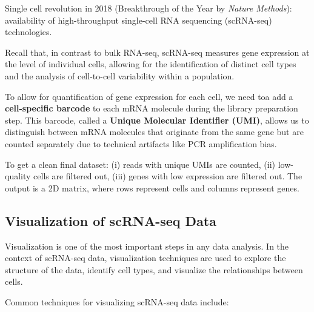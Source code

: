 \documentclass[a4paper]{article}
\begin{document}
Single cell revolution in 2018 (Breakthrough of the Year by \textit{Nature Methods}): availability
of high-throughput single-cell RNA sequencing (scRNA-seq) technologies.

Recall that, in contrast to bulk RNA-seq, scRNA-seq measures gene expression at the level of
individual cells, allowing for the identification of distinct cell types and the analysis of
cell-to-cell variability within a population.

To allow for quantification of gene expression for each cell, we need 
toa add a \textbf{cell-specific barcode} to each mRNA molecule during the library preparation
step. This barcode, called a \textbf{Unique Molecular Identifier (UMI)}, allows us to
distinguish between mRNA molecules that originate from the same gene but are counted
separately due to technical artifacts like PCR amplification bias.

To get a clean final dataset: (i) reads with unique UMIs are counted,
(ii) low-quality cells are filtered out, (iii) genes with low expression 
are filtered out. The output is a 2D matrix, where rows represent cells
and columns represent genes.

\subsection*{Visualization of scRNA-seq Data}

Visualization is one of the most important steps in any data analysis.
In the context of scRNA-seq data, visualization techniques are used to
explore the structure of the data, identify cell types, and visualize
the relationships between cells.

Common techniques for visualizing scRNA-seq data include:
\end{document}
